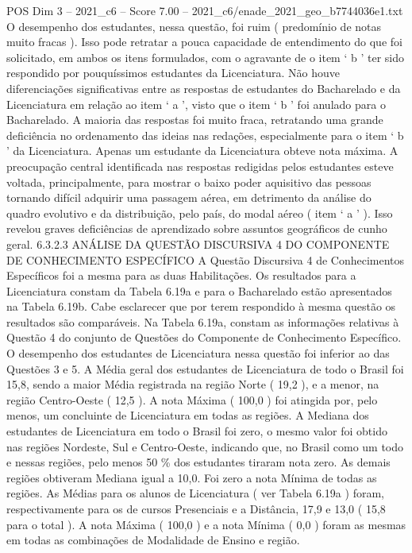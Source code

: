 \begin{textsample}{POS Dim 3 – 2021\_c6 – Score 7.00 – 2021\_c6/enade\_2021\_geo\_b7744036e1.txt}
O desempenho dos estudantes, nessa questão, foi ruim ( predomínio de notas muito fracas ).
Isso pode retratar a pouca capacidade de entendimento do que foi solicitado, em ambos os itens formulados, com o agravante de o item ‘ b ’ ter sido respondido por pouquíssimos estudantes da Licenciatura.
Não houve diferenciações significativas entre as respostas de estudantes do Bacharelado e da Licenciatura em relação ao item ‘ a ’, visto que o item ‘ b ’ foi anulado para o Bacharelado.
A maioria das respostas foi muito fraca, retratando uma grande deficiência no ordenamento das ideias nas redações, especialmente para o item ‘ b ’ da Licenciatura.
Apenas um estudante da Licenciatura obteve nota máxima.
A preocupação central identificada nas respostas redigidas pelos estudantes esteve voltada, principalmente, para mostrar o baixo poder aquisitivo das pessoas tornando difícil adquirir uma passagem aérea, em detrimento da análise do quadro evolutivo e da distribuição, pelo país, do modal aéreo ( item ‘ a ’ ).
Isso revelou graves deficiências de aprendizado sobre assuntos geográficos de cunho geral. 6.3.2.3 ANÁLISE DA QUESTÃO DISCURSIVA 4 DO COMPONENTE DE CONHECIMENTO ESPECÍFICO A Questão Discursiva 4 de Conhecimentos Específicos foi a mesma para as duas Habilitações.
Os resultados para a Licenciatura constam da Tabela 6.19a e para o Bacharelado estão apresentados na Tabela 6.19b.
Cabe esclarecer que por terem respondido à mesma questão os resultados são comparáveis.
Na Tabela 6.19a, constam as informações relativas à Questão 4 do conjunto de Questões do Componente de Conhecimento Específico.
O desempenho dos estudantes de Licenciatura nessa questão foi inferior ao das Questões 3 e 5.
A Média geral dos estudantes de Licenciatura de todo o Brasil foi 15,8, sendo a maior Média registrada na região Norte ( 19,2 ), e a menor, na região Centro-Oeste ( 12,5 ).
A nota Máxima ( 100,0 ) foi atingida por, pelo menos, um concluinte de Licenciatura em todas as regiões.
A Mediana dos estudantes de Licenciatura em todo o Brasil foi zero, o mesmo valor foi obtido nas regiões Nordeste, Sul e Centro-Oeste, indicando que, no Brasil como um todo e nessas regiões, pelo menos 50 \% dos estudantes tiraram nota zero.
As demais regiões obtiveram Mediana igual a 10,0.
Foi zero a nota Mínima de todas as regiões.
As Médias para os alunos de Licenciatura ( ver Tabela 6.19a ) foram, respectivamente para os de cursos Presenciais e a Distância, 17,9 e 13,0 ( 15,8 para o total ).
A nota Máxima ( 100,0 ) e a nota Mínima ( 0,0 ) foram as mesmas em todas as combinações de Modalidade de Ensino e região.

\end{textsample}
